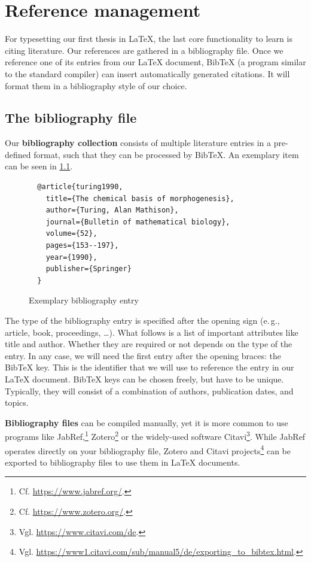 \chapter{Reference management}
\label{sec:literature}

For typesetting our first thesis in \LaTeX{}, the last core functionality to learn is citing literature.
Our references are gathered in a bibliography file.
Once we reference one of its entries from our \LaTeX{} document, Bib\TeX{} (a 
program similar to the standard  compiler)
can insert automatically generated citations.
It will format them in a bibliography style of our choice.

\section{The bibliography file}
Our \textbf{bibliography collection} consists of multiple literature entries in a pre-defined format, such that they can be processed by Bib\TeX{}.
An exemplary item can be seen in \cref{lst:bibfile-sample-entry}.

\begin{figure}[H]
  \begin{verbatim}
  @article{turing1990,
    title={The chemical basis of morphogenesis},
    author={Turing, Alan Mathison},
    journal={Bulletin of mathematical biology},
    volume={52},
    pages={153--197},
    year={1990},
    publisher={Springer}
  }
  \end{verbatim}
  \caption{Exemplary bibliography entry}
  \label{lst:bibfile-sample-entry}
\end{figure}

The type of the bibliography entry is specified after the opening  sign (e.\,g., article, book, proceedings, …).
What follows is a list of important attributes like title and author.
Whether they are required or not depends on the type of the entry.
In any case, we will need the first entry after the opening braces: the Bib\TeX{} key.
This is the identifier that we will use to reference the entry in our \LaTeX{} document.
Bib\TeX{} keys can be chosen freely, but have to be unique.
Typically, they will consist of a combination of authors, publication dates, and topics.

\textbf{Bibliography files} can be compiled manually, yet it is more common to use programs like JabRef,\footnote{Cf. \url{https://www.jabref.org/}.} Zotero\footnote{Cf. \url{https://www.zotero.org/}.} or the widely-used software Citavi\footnote{Vgl. \url{https://www.citavi.com/de}.}.
While JabRef operates directly on your bibliography file, Zotero and Citavi projects\footnote{Vgl. \url{https://www1.citavi.com/sub/manual5/de/exporting_to_bibtex.html}.} can be exported to bibliography files to use them in \LaTeX{} documents.

